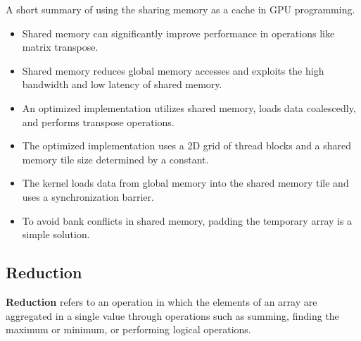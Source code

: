


\par
A short summary of using the sharing memory as a cache in GPU programming.
\begin{itemize}
    \item Shared memory can significantly improve performance in operations like matrix transpose.
    \item Shared memory reduces global memory accesses and exploits the high bandwidth and low latency of shared memory.
    \item An optimized implementation utilizes shared memory, loads data coalescedly, and performs transpose operations.
    \item The optimized implementation uses a 2D grid of thread blocks and a shared memory tile size determined by a constant.
    \item The kernel loads data from global memory into the shared memory tile and uses a synchronization barrier.
    \item To avoid bank conflicts in shared memory, padding the temporary array is a simple solution.
\end{itemize}




\subsection{Reduction}


\par
\textbf{Reduction} refers to an operation in which the elements of an array are aggregated in a single value through operations such as summing, finding the maximum or minimum, or performing logical operations.



